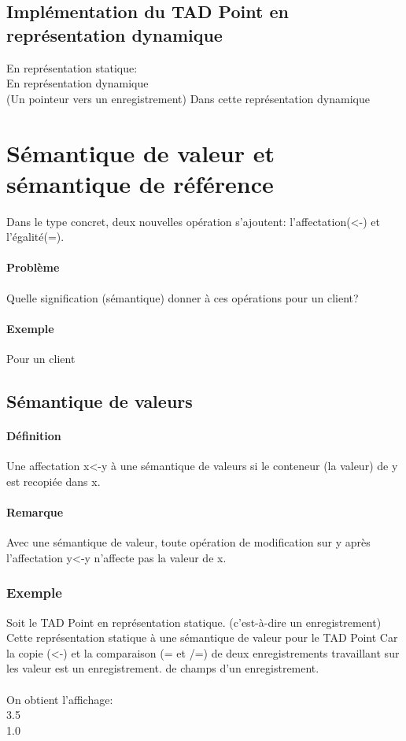	\subsection{Implémentation du TAD Point en représentation dynamique}
		En représentation statique: \\
%			
		En représentation dynamique \\
%			
		(Un pointeur vers un enregistrement)
		Dans cette représentation dynamique		
		


\section{Sémantique de valeur et sémantique de référence}
	Dans le type concret, deux nouvelles opération s'ajoutent: l'affectation(<-) et l'égalité(=).
	\paragraph{Problème} Quelle signification (sémantique) donner à ces opérations pour un client? 
	\paragraph{Exemple} Pour un client
		

	\subsection{Sémantique de valeurs}
		\paragraph{Définition}
			Une affectation x<-y à une sémantique de valeurs si le conteneur (la valeur) de y est 
				recopiée dans x.
		\paragraph{Remarque}
			Avec une sémantique de valeur, toute opération de modification sur y après l'affectation y<-y
			n'affecte pas la valeur de x.
		\subsubsection{Exemple}
			Soit le TAD Point en représentation statique. (c'est-à-dire un enregistrement)\\
			Cette représentation statique à une sémantique de valeur pour le TAD Point
			Car la copie (<-) et la comparaison (= et /=) de deux enregistrements travaillant sur les
			valeur est un enregistrement.
			de champs d'un enregistrement. \\
			\\
			
			
			
			On obtient l'affichage: \\
			3.5\\1.0

